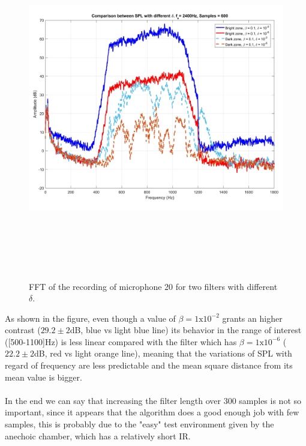 \begin{figure}[H]
\centering
\includegraphics[width=14.5cm,height=15cm,keepaspectratio]{Figures/filter_5vs25}
\decoRule
\caption[FFT filters same beta]{FFT of the recording of microphone 20 for two filters with different $\delta$.}
\label{fig:filter_5vs25}
\end{figure}

As shown in the figure, even though a value of $\beta = 1\text{x}10^{-2}$ grants an higher contrast ($29.2\pm2$dB, blue vs light blue line) its behavior in the range of interest ([500-1100]Hz) is less linear compared with the filter which has $\beta = 1\text{x}10^{-6}$ ($22.2\pm2$dB, red vs light orange line), meaning that the variations of SPL with regard of frequency are less predictable and the mean square distance from its mean value is bigger.
\\
\\
In the end we can say that increasing the filter length over $300$ samples is not so important, since it appears that the algorithm does a good enough job with few samples, this is probably due to the "easy" test environment given by the anechoic chamber, which has a relatively short IR.


